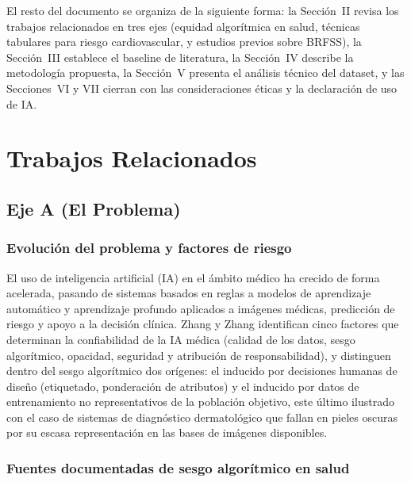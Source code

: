 \documentclass[conference]{IEEEtran}
\begin{document}
El resto del documento se organiza de la siguiente forma: la Sección~II revisa los trabajos relacionados en tres ejes (equidad algorítmica en salud, técnicas tabulares para riesgo cardiovascular, y estudios previos sobre BRFSS), la Sección~III establece el baseline de literatura, la Sección~IV describe la metodología propuesta, la Sección~V presenta el análisis técnico del dataset, y las Secciones~VI y VII cierran con las consideraciones éticas y la declaración de uso de IA.


\section{Trabajos Relacionados}

\subsection{Eje A (El Problema)}

\subsubsection{Evolución del problema y factores de riesgo}

El uso de inteligencia artificial (IA) en el ámbito médico ha crecido de forma acelerada, pasando de sistemas basados en reglas a modelos de aprendizaje automático y aprendizaje profundo aplicados a imágenes médicas, predicción de riesgo y apoyo a la decisión clínica. Zhang y Zhang \cite{zhang2023ethics} identifican cinco factores que determinan la confiabilidad de la IA médica (calidad de los datos, sesgo algorítmico, opacidad, seguridad y atribución de responsabilidad), y distinguen dentro del sesgo algorítmico dos orígenes: el inducido por decisiones humanas de diseño (etiquetado, ponderación de atributos) y el inducido por datos de entrenamiento no representativos de la población objetivo, este último ilustrado con el caso de sistemas de diagnóstico dermatológico que fallan en pieles oscuras por su escasa representación en las bases de imágenes disponibles.

\subsubsection{Fuentes documentadas de sesgo algorítmico en salud}
\end{document}
